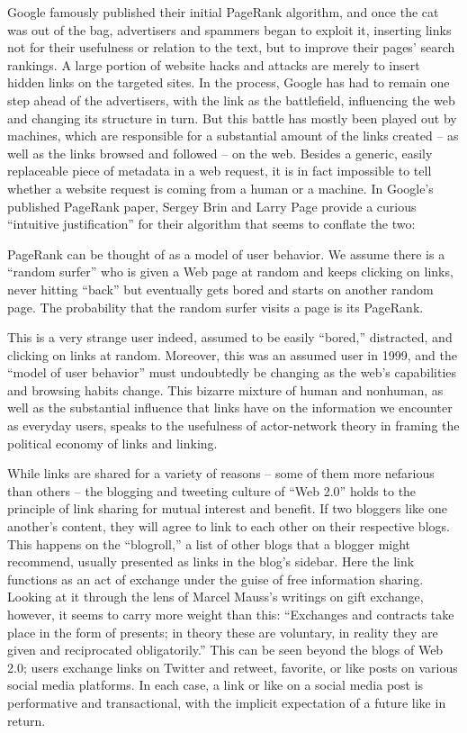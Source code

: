 Google famously published their initial PageRank algorithm, and once the cat was out of the bag, advertisers and spammers began to exploit it, inserting links not for their usefulness or relation to the text, but to improve their pages’ search rankings. A large portion of website hacks and attacks are merely to insert hidden links on the targeted sites. In the process, Google has had to remain one step ahead of the advertisers, with the link as the battlefield, influencing the web and changing its structure in turn. But this battle has mostly been played out by machines, which are responsible for a substantial amount of the links created – as well as the links browsed and followed – on the web. Besides a generic, easily replaceable piece of metadata in a web request, it is in fact impossible to tell whether a website request is coming from a human or a machine. In Google’s published PageRank paper, Sergey Brin and Larry Page provide a curious “intuitive justification” for their algorithm that seems to conflate the two:

PageRank can be thought of as a model of user behavior. We assume there is a “random surfer” who is given a Web page at random and keeps clicking on links, never hitting “back” but eventually gets bored and starts on another random page. The probability that the random surfer visits a page is its PageRank. 

This is a very strange user indeed, assumed to be easily “bored,” distracted, and clicking on links at random. Moreover, this was an assumed user in 1999, and the “model of user behavior” must undoubtedly be changing as the web’s capabilities and browsing habits change. This bizarre mixture of human and nonhuman, as well as the substantial influence that links have on the information we encounter as everyday users, speaks to the usefulness of actor-network theory in framing the political economy of links and linking.

While links are shared for a variety of reasons – some of them more nefarious than others – the blogging and tweeting culture of “Web 2.0” holds to the principle of link sharing for mutual interest and benefit. If two bloggers like one another’s content, they will agree to link to each other on their respective blogs. This happens on the “blogroll,” a list of other blogs that a blogger might recommend, usually presented as links in the blog’s sidebar. Here the link functions as an act of exchange under the guise of free information sharing. Looking at it through the lens of Marcel Mauss’s writings on gift exchange, however, it seems to carry more weight than this: “Exchanges and contracts take place in the form of presents; in theory these are voluntary, in reality they are given and reciprocated obligatorily.”  This can be seen beyond the blogs of Web 2.0; users exchange links on Twitter and retweet, favorite, or like posts on various social media platforms. In each case, a link or like on a social media post is performative and transactional, with the implicit expectation of a future like in return.


